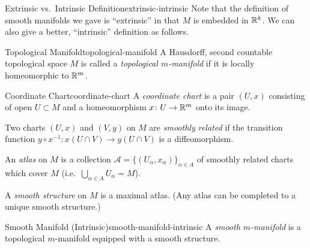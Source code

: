 \begin{remark}{Extrinsic vs.\ Intrinsic Definition}{extrinsic-intrinsic}
    Note that the definition of smooth manifolds we gave is ``extrinsic'' in that $M$ is embedded in $\mathbb{R}^k$. We can also give a better, ``intrinsic'' definition as follows.
\end{remark}

\begin{definition}{Topological Manifold}{topological-manifold}
    A Hausdorff, second countable topological space $M$ is called a \emph{topological $m$-manifold} if it is locally homeomorphic to $\mathbb{R}^m$.
\end{definition}

\begin{definition}{Coordinate Chart}{coordinate-chart}
    A \emph{coordinate chart} is a pair $(U, x)$ consisting of open $U \subset M$ and a homeomorphism $x \colon U \to \mathbb{R}^m$ onto its image.
\end{definition}

Two charts $(U, x)$ and $(V, y)$ on $M$ are \emph{smoothly related} if the transition function $y \circ x^{-1} \colon x(U \cap V) \to y(U \cap V)$ is a diffeomorphism.

An \emph{atlas} on $M$ is a collection $\mathcal{A} = \{(U_\alpha, x_\alpha)\}_{\alpha \in A}$ of smoothly related charts which cover $M$ (i.e.\ $\bigcup_{\alpha \in A} U_\alpha = M$).

A \emph{smooth structure} on $M$ is a maximal atlas. (Any atlas can be completed to a unique smooth structure.)

\begin{definition}{Smooth Manifold (Intrinsic)}{smooth-manifold-intrinsic}
    A \emph{smooth $m$-manifold} is a topological $m$-manifold equipped with a smooth structure.
\end{definition}
